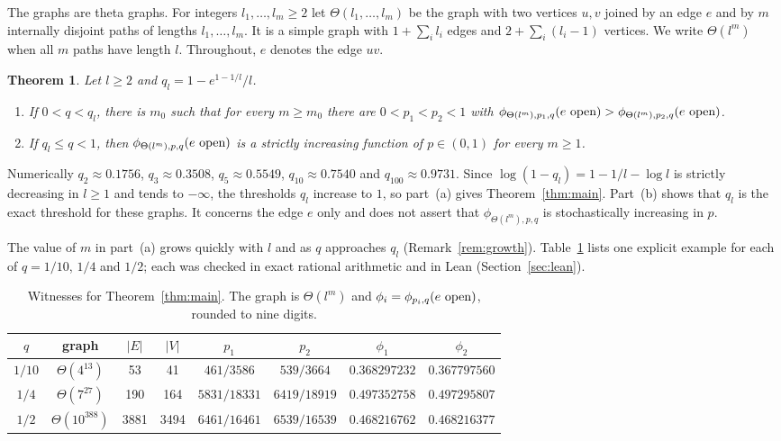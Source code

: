 \documentclass[11pt]{amsart}
\newtheorem{theorem}{Theorem}[section]
\theoremstyle{remark}
\numberwithin{equation}{section}
\newcommand{\open}{\ \textup{open}}
\begin{document}
The graphs are theta graphs. For integers $l_1,\dots,l_m\ge2$ let $\Theta(l_1,\dots,l_m)$ be the graph with two vertices $u,v$ joined by an edge $e$ and by $m$ internally disjoint paths of lengths $l_1,\dots,l_m$. It is a simple graph with $1+\sum_il_i$ edges and $2+\sum_i(l_i-1)$ vertices. We write $\Theta(l^m)$ when all $m$ paths have length $l$. Throughout, $e$ denotes the edge $uv$.

\begin{theorem}\label{thm:threshold}
Let $l\ge2$ and $q_l=1-e^{1-1/l}/l$.
\begin{enumerate}[label=\textup{(\alph*)},leftmargin=2em]
\item If $0<q<q_l$, there is $m_0$ such that for every $m\ge m_0$ there are $0<p_1<p_2<1$ with $\phi_{\Theta(l^m),p_1,q}(e\open)>\phi_{\Theta(l^m),p_2,q}(e\open)$.
\item If $q_l\le q<1$, then $\phi_{\Theta(l^m),p,q}(e\open)$ is a strictly increasing function of $p\in(0,1)$ for every $m\ge1$.
\end{enumerate}
\end{theorem}

Numerically $q_2\approx0.1756$, $q_3\approx0.3508$, $q_5\approx0.5549$, $q_{10}\approx0.7540$ and $q_{100}\approx0.9731$. Since $\log(1-q_l)=1-1/l-\log l$ is strictly decreasing in $l\ge1$ and tends to $-\infty$, the thresholds $q_l$ increase to $1$, so part~(a) gives Theorem~\ref{thm:main}. Part~(b) shows that $q_l$ is the exact threshold for these graphs. It concerns the edge $e$ only and does not assert that $\phi_{\Theta(l^m),p,q}$ is stochastically increasing in $p$.

The value of $m$ in part~(a) grows quickly with $l$ and as $q$ approaches $q_l$ (Remark~\ref{rem:growth}). Table~\ref{tab:witnesses} lists one explicit example for each of $q=1/10$, $1/4$ and $1/2$; each was checked in exact rational arithmetic and in Lean (Section~\ref{sec:lean}).

\begin{table}[ht]
\caption{Witnesses for Theorem~\ref{thm:main}. The graph is $\Theta(l^m)$ and $\phi_i=\phi_{p_i,q}(e\open)$, rounded to nine digits.}\label{tab:witnesses}
\begin{tabular}{@{}cccccccc@{}}
\toprule
$q$ & graph & $|E|$ & $|V|$ & $p_1$ & $p_2$ & $\phi_1$ & $\phi_2$\\
\midrule
$1/10$ & $\Theta(4^{13})$ & 53 & 41 & $461/3586$ & $539/3664$ & $0.368297232$ & $0.367797560$\\
$1/4$ & $\Theta(7^{27})$ & 190 & 164 & $5831/18331$ & $6419/18919$ & $0.497352758$ & $0.497295807$\\
$1/2$ & $\Theta(10^{388})$ & 3881 & 3494 & $6461/16461$ & $6539/16539$ & $0.468216762$ & $0.468216377$\\
\bottomrule
\end{tabular}
\end{table}
\end{document}
